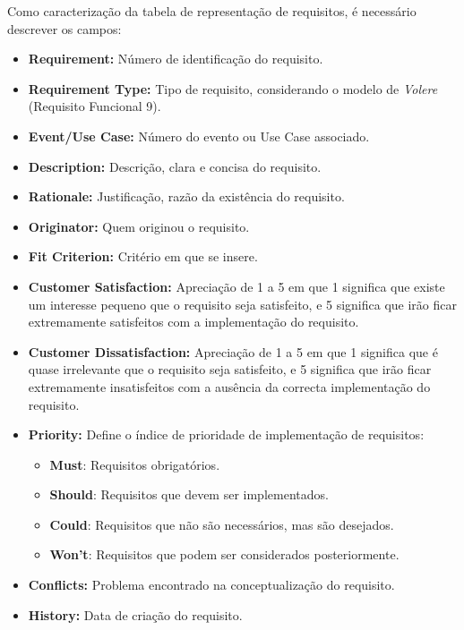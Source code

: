 Como caracterização da tabela de representação de requisitos, é necessário descrever os campos:
\begin{itemize}
    \item \textbf{Requirement:} Número de identificação do requisito.
    \item \textbf{Requirement Type:} Tipo de requisito, considerando o modelo de \textit{Volere} (Requisito Funcional 9).
    \item \textbf{Event/Use Case:} Número do evento ou Use Case associado.
    \item \textbf{Description:} Descrição, clara e concisa do requisito.
    \item \textbf{Rationale:} Justificação, razão da existência do requisito.
    \item \textbf{Originator:} Quem originou o requisito.
    \item \textbf{Fit Criterion:} Critério em que se insere.
    \item \textbf{Customer Satisfaction:} Apreciação de 1 a 5 em que 1 significa que existe um interesse pequeno que o requisito seja satisfeito, e 5 significa que irão ficar extremamente satisfeitos com a implementação do requisito.
    \item \textbf{Customer Dissatisfaction:} Apreciação de 1 a 5 em que 1 significa que é quase irrelevante que o requisito seja satisfeito, e 5 significa que irão ficar extremamente insatisfeitos com a ausência da correcta implementação do requisito.
    \item \textbf{Priority:} Define o índice de prioridade de implementação de requisitos:
    \begin{itemize}
        \item \textbf{\color{red}Must}: Requisitos obrigatórios.
        \item \textbf{\color{orange}Should}: Requisitos que devem ser implementados.
        \item \textbf{\color{blue}Could}: Requisitos que não são necessários, mas são desejados.
        \item \textbf{\color{OliveGreen}Won't}: Requisitos que podem ser considerados posteriormente.
    \end{itemize}
    \item \textbf{Conflicts:} Problema encontrado na conceptualização do requisito.
    \item \textbf{History:} Data de criação do requisito.
\end{itemize}


